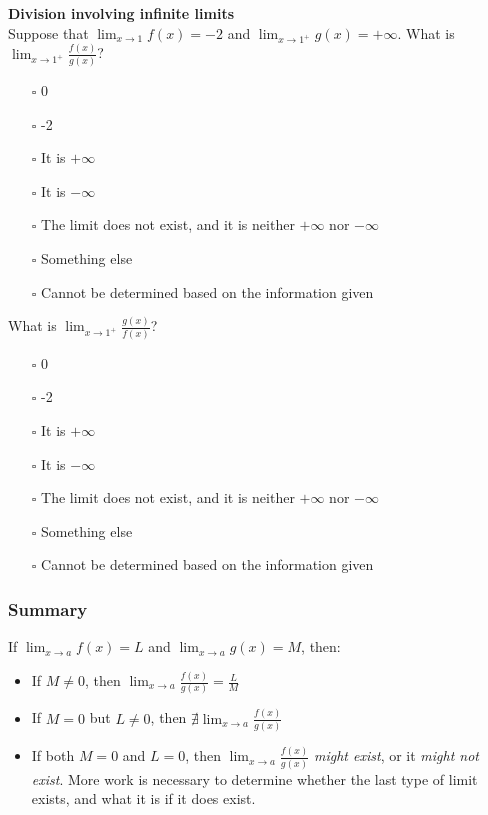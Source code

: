 \documentclass[pdftex, brazil, 12pt, twoside]{article}
\begin{document}
\begin{exercise}
  \textbf{Division involving infinite limits}\\
  Suppose that $\displaystyle \lim_{x \to 1}f(x) = -2$ and
  $\displaystyle \lim_{x \to 1^+}g(x) = +\infty$. What is
  $\displaystyle \lim_{x \to 1^+}\frac{f(x)}{g(x)}$?
  \begin{itemize}[noitemsep]
  \item[$\square$] 0
  \item[$\square$] -2
  \item[$\square$] It is $+\infty$
  \item[$\square$] It is $-\infty$
  \item[$\square$] The limit does not exist, and it is neither $+\infty$ nor $-\infty$
  \item[$\square$] Something else
  \item[$\square$] Cannot be determined based on the information given
  \end{itemize}

  What is
  $\displaystyle \lim_{x \to 1^+}\frac{g(x)}{f(x)}$?
  \begin{itemize}[noitemsep]
  \item[$\square$] 0
  \item[$\square$] -2
  \item[$\square$] It is $+\infty$
  \item[$\square$] It is $-\infty$
  \item[$\square$] The limit does not exist, and it is neither $+\infty$ nor $-\infty$
  \item[$\square$] Something else
  \item[$\square$] Cannot be determined based on the information given
  \end{itemize}
\end{exercise}

\subsubsection{Summary}
\label{u0-lim-quo-summary}

If $\displaystyle \lim_{x \to a}f(x) = L$ and $\displaystyle \lim_{x \to a}g(x) = M$,
then:

\begin{itemize}
\item If $M \ne 0$, then $\displaystyle \lim_{x \to a}\frac{f(x)}{g(x)} = \frac{L}{M}$
\item If $M = 0$ but $L \ne 0$, then $\displaystyle \nexists \lim_{x \to a}\frac{f(x)}{g(x)}$
\item If both $M = 0$ and $L = 0$, then $\displaystyle \lim_{x \to a}\frac{f(x)}{g(x)}$
  \emph{might exist}, or it \emph{might not exist}. More work is necessary to determine whether the
  last type of limit exists, and what it is if it does exist.
\end{itemize}
\end{document}
